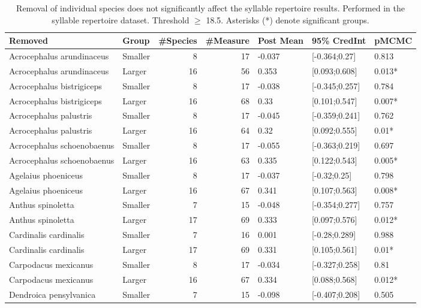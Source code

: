 \documentclass{article}
\begin{document}
  \begin{table}[H]
  \centering
  \caption{Removal of individual species does not significantly affect the syllable repertoire
  results. Performed in the syllable repertoire dataset. Threshold $\ge$ 18.5. Asterisks (*) denote significant groups.}
  \begin{tabular}{llrrlll}
  \hline
  Removed & Group & \#Species & \#Measure & Post Mean & 95\% CredInt & pMCMC \\ 
  \hline
  Acrocephalus arundinaceus & Smaller & 8 & 17 & -0.037 & [-0.364;0.27] & 0.813 \\ 
  Acrocephalus arundinaceus & Larger & 16 & 56 & 0.353 & [0.093;0.608] & 0.013* \\ 
  Acrocephalus bistrigiceps & Smaller & 8 & 17 & -0.038 & [-0.345;0.257] & 0.784 \\ 
  Acrocephalus bistrigiceps & Larger & 16 & 68 & 0.33 & [0.101;0.547] & 0.007* \\ 
  Acrocephalus palustris & Smaller & 8 & 17 & -0.045 & [-0.359;0.241] & 0.762 \\ 
  Acrocephalus palustris & Larger & 16 & 64 & 0.32 & [0.092;0.555] & 0.01* \\ 
  Acrocephalus schoenobaenus & Smaller & 8 & 17 & -0.055 & [-0.363;0.219] & 0.697 \\ 
  Acrocephalus schoenobaenus & Larger & 16 & 63 & 0.335 & [0.122;0.543] & 0.005* \\ 
  Agelaius phoeniceus & Smaller & 8 & 17 & -0.037 & [-0.32;0.25] & 0.798 \\ 
  Agelaius phoeniceus & Larger & 16 & 67 & 0.341 & [0.107;0.563] & 0.008* \\ 
  Anthus spinoletta & Smaller & 7 & 15 & -0.048 & [-0.354;0.277] & 0.757 \\ 
  Anthus spinoletta & Larger & 17 & 69 & 0.333 & [0.097;0.576] & 0.012* \\ 
  Cardinalis cardinalis & Smaller & 7 & 16 & 0.001 & [-0.28;0.289] & 0.988 \\ 
  Cardinalis cardinalis & Larger & 17 & 69 & 0.331 & [0.105;0.561] & 0.01* \\ 
  Carpodacus mexicanus & Smaller & 8 & 17 & -0.034 & [-0.327;0.258] & 0.81 \\ 
  Carpodacus mexicanus & Larger & 16 & 67 & 0.334 & [0.088;0.568] & 0.012* \\ 
  Dendroica pensylvanica & Smaller & 7 & 15 & -0.098 & [-0.407;0.208] & 0.505 \\ 

\end{tabular}
\end{table}
\end{document}

